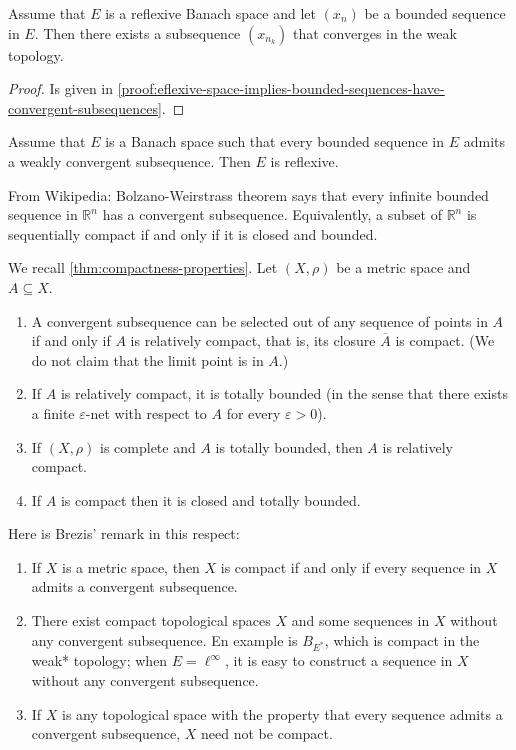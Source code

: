 \documentclass{article}
\theoremstyle{definition}
\numberwithin{equation}{section}
\newcommand{\R}{\mathbb{R}}
\begin{document}
	\begin{thm}\label{thm:reflexive-space-implies-bounded-sequences-have-convergent-subsequences}
		Assume that $E$ is a reflexive Banach space and let $(x_n)$ be a bounded sequence in $E$. Then there exists a subsequence $(x_{n_k})$ that converges in the weak topology.
	\end{thm}
	\begin{proof}
		Is given in \cref{proof:eflexive-space-implies-bounded-sequences-have-convergent-subsequences}.
	\end{proof}
	\begin{thm}
		Assume that $E$ is a Banach space such that every bounded sequence in $E$ admits a weakly convergent subsequence. Then $E$ is reflexive.
	\end{thm}
	\begin{remark}
		From Wikipedia: Bolzano-Weirstrass theorem says that every infinite bounded sequence in $\R^n$ has a convergent subsequence. Equivalently, a subset of $\R^n$ is sequentially compact if and only if it is closed and bounded.
	\end{remark}
	\begin{remark}
		We recall \cref{thm:compactness-properties}. Let $(X,\rho)$ be a metric space and $A\subseteq X$.
		\begin{enumerate}
			\item A convergent subsequence can be selected out of any sequence of points in $A$ if and only if $A$ is relatively compact, that is, its closure $\overline{A}$ is compact. (We do not claim that the limit point is in $A$.)
			\item If $A$ is relatively compact, it is totally bounded (in the sense that there exists a finite $\varepsilon$-net with respect to $A$ for every $\varepsilon>0$).
			\item If $(X,\rho)$ is complete and $A$ is totally bounded, then $A$ is relatively compact. 
			\item If $A$ is compact then it is closed and totally bounded.
		\end{enumerate}
	\end{remark}
	\begin{remark}Here is Brezis' remark in this respect:
		\begin{enumerate}
			\item If $X$ is a metric space, then $X$ is compact if and only if every sequence in $X$ admits a convergent subsequence.
			\item There exist compact topological spaces $X$ and some sequences in $X$ without any convergent subsequence. En example is $B_{E^*}$, which is compact in the weak* topology; when $E=\ell^\infty$, it is easy to construct a sequence in $X$ without any convergent subsequence.
			\item If $X$ is any topological space with the property that every sequence admits a convergent subsequence, $X$ need not be compact.	
		\end{enumerate}
	\end{remark}
\end{document}
